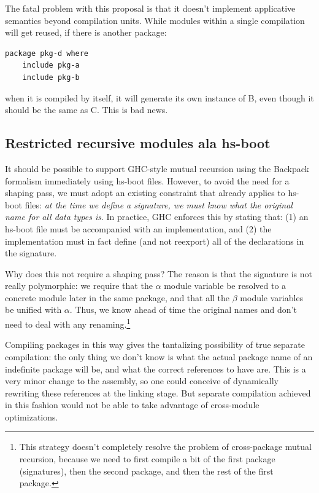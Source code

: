 \documentclass{article}
\begin{document}
The fatal problem with this proposal is that it doesn't implement applicative
semantics beyond compilation units.  While modules within a single
compilation will get reused, if there is another package:

\begin{verbatim}
package pkg-d where
    include pkg-a
    include pkg-b
\end{verbatim}

when it is compiled by itself, it will generate its own instance of B,
even though it should be the same as C.  This is bad news.

\subsection{Restricted recursive modules ala hs-boot}\label{sec:hs-boot-restrict}

It should be possible to support GHC-style mutual recursion using the
Backpack formalism immediately using hs-boot files.  However, to avoid
the need for a shaping pass, we must adopt an existing constraint that
already applies to hs-boot files: \emph{at the time we define a signature,
we must know what the original name for all data types is}.  In practice,
GHC enforces this by stating that: (1) an hs-boot file must be
accompanied with an implementation, and (2) the implementation must
in fact define (and not reexport) all of the declarations in the signature.

Why does this not require a shaping pass? The reason is that the
signature is not really polymorphic: we require that the $\alpha$ module
variable be resolved to a concrete module later in the same package, and
that all the $\beta$ module variables be unified with $\alpha$. Thus, we
know ahead of time the original names and don't need to deal with any
renaming.\footnote{This strategy doesn't completely resolve the problem
of cross-package mutual recursion, because we need to first compile a
bit of the first package (signatures), then the second package, and then
the rest of the first package.}

Compiling packages in this way gives the tantalizing possibility
of true separate compilation: the only thing we don't know is what the actual
package name of an indefinite package will be, and what the correct references
to have are.  This is a very minor change to the assembly, so one could conceive
of dynamically rewriting these references at the linking stage.  But
separate compilation achieved in this fashion would not be able to take
advantage of cross-module optimizations.
\end{document}
